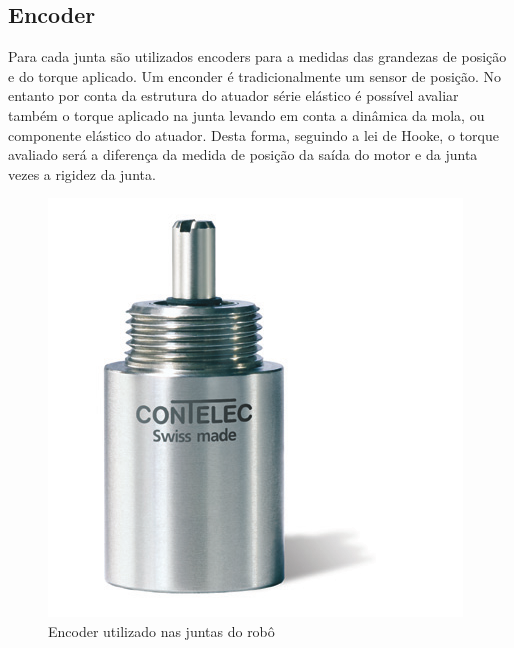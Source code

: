 



\subsection{Encoder}


Para cada junta são utilizados encoders para a medidas das grandezas de posição e do torque aplicado. Um enconder é tradicionalmente um sensor de posição. No entanto por conta da estrutura do atuador série elástico é possível avaliar também o torque aplicado na junta levando em conta a dinâmica da mola, ou componente elástico do atuador. Desta forma, seguindo a lei de Hooke, o torque avaliado será a diferença da medida de posição da saída do motor e da junta vezes a rigidez da junta. 

\begin{figure}[H]
    \centering
    \includegraphics[width = 0.4\linewidth]{figs/vertX-encoder}
        \caption{Encoder utilizado nas juntas do robô}
    \label{fig:encoder}
\end{figure}

